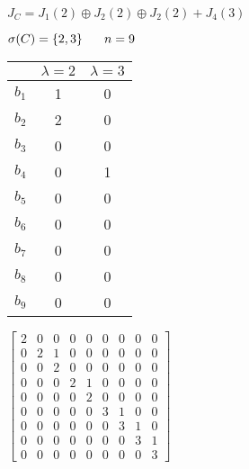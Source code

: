 \documentclass[letterpaper,12pt,fleqn]{article}
\renewcommand{\l}{\lambda}
\renewcommand{\o}{\sigma}
\begin{document}
\begin{example}
  $J_C=J_1(2)\oplus J_2(2)\oplus J_2(2)+J_4(3)$

  \bigskip

  $\o(C)=\{2,3\}\hspace{4ex}n=9$

  \bigskip

  \begin{minipage}{3in}
    \begin{tabular}{c|cc}
      & $\l=2$ & $\l=3$ \\
      \hline
      $b_1$ & 1 & 0 \\
      $b_2$ & 2 & 0 \\
      $b_3$ & 0 & 0 \\
      $b_4$ & 0 & 1 \\
      $b_5$ & 0 & 0 \\
      $b_6$ & 0 & 0 \\
      $b_7$ & 0 & 0 \\
      $b_8$ & 0 & 0 \\
      $b_9$ & 0 & 0
    \end{tabular}
  \end{minipage}
  \begin{minipage}{3in}
    $\left[\begin{array}{c|cc|cc|cccc}
          2 & 0 & 0 & 0 & 0 & 0 & 0 & 0 & 0 \\
          \hline
          0 & 2 & 1 & 0 & 0 & 0 & 0 & 0 & 0 \\
          0 & 0 & 2 & 0 & 0 & 0 & 0 & 0 & 0 \\
          \hline
          0 & 0 & 0 & 2 & 1 & 0 & 0 & 0 & 0 \\
          0 & 0 & 0 & 0 & 2 & 0 & 0 & 0 & 0 \\
          \hline
          0 & 0 & 0 & 0 & 0 & 3 & 1 & 0 & 0 \\
          0 & 0 & 0 & 0 & 0 & 0 & 3 & 1 & 0 \\
          0 & 0 & 0 & 0 & 0 & 0 & 0 & 3 & 1 \\
          0 & 0 & 0 & 0 & 0 & 0 & 0 & 0 & 3
      \end{array}\right]$
  \end{minipage}
\end{example}
\end{document}
